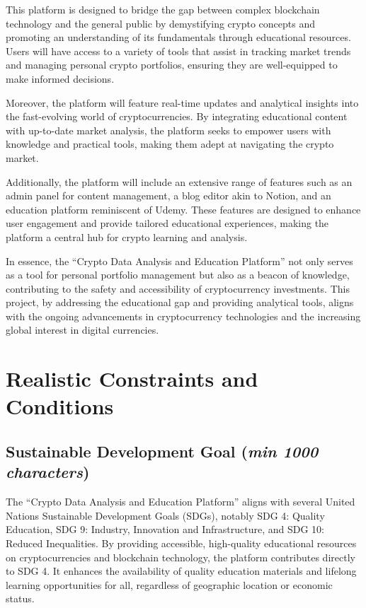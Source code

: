 \documentclass[12pt]{report}
\newcommand{\characters}[1]{(\textit{min #1 characters})}
\begin{document}
This platform is designed to bridge the gap between complex blockchain technology and the general public by demystifying crypto concepts and promoting an understanding of its fundamentals through educational resources. Users will have access to a variety of tools that assist in tracking market trends and managing personal crypto portfolios, ensuring they are well-equipped to make informed decisions.

Moreover, the platform will feature real-time updates and analytical insights into the fast-evolving world of cryptocurrencies. By integrating educational content with up-to-date market analysis, the platform seeks to empower users with knowledge and practical tools, making them adept at navigating the crypto market.

Additionally, the platform will include an extensive range of features such as an admin panel for content management, a blog editor akin to Notion, and an education platform reminiscent of Udemy. These features are designed to enhance user engagement and provide tailored educational experiences, making the platform a central hub for crypto learning and analysis.

In essence, the ``Crypto Data Analysis and Education Platform'' not only serves as a tool for personal portfolio management but also as a beacon of knowledge, contributing to the safety and accessibility of cryptocurrency investments. This project, by addressing the educational gap and providing analytical tools, aligns with the ongoing advancements in cryptocurrency technologies and the increasing global interest in digital currencies.

\section{Realistic Constraints and Conditions}

\subsection{Sustainable Development Goal \characters{1000}}
The ``Crypto Data Analysis and Education Platform'' aligns with several United Nations Sustainable Development Goals (SDGs), notably SDG 4: Quality Education, SDG 9: Industry, Innovation and Infrastructure, and SDG 10: Reduced Inequalities. By providing accessible, high-quality educational resources on cryptocurrencies and blockchain technology, the platform contributes directly to SDG 4. It enhances the availability of quality education materials and lifelong learning opportunities for all, regardless of geographic location or economic status.
\end{document}
